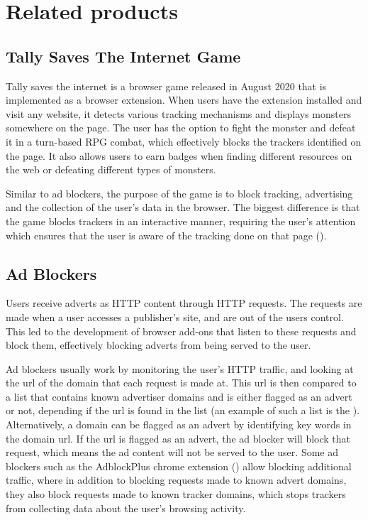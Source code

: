 \documentclass{l4proj}
\begin{document}
\section{Related products}
\label{related}
\subsection{Tally Saves The Internet Game}
Tally saves the internet is a browser game released in August 2020 that is implemented as a browser extension. When users have the extension installed and visit any website, it detects various tracking mechanisms and displays monsters somewhere on the page. The user has the option to fight the monster and defeat it in a turn-based RPG combat, which effectively blocks the trackers identified on the page. It also allows users to earn badges when finding different resources on the web or defeating different types of monsters.

Similar to ad blockers, the purpose of the game is to block tracking, advertising and the collection of the user's data in the browser. The biggest difference is that the game blocks trackers in an interactive manner, requiring the user's attention which ensures that the user is aware of the tracking done on that page (\cite{tally}). 

\subsection{Ad Blockers}
Users receive adverts as HTTP content through HTTP requests. The requests are made when a user accesses a publisher's site, and are out of the users control. This led to the development of browser add-ons that listen to these requests and block them, effectively blocking adverts from being served to the user. 

Ad blockers usually work by monitoring the user's HTTP traffic, and looking at the url of the domain that each request is made at. This url is then compared to a list that contains known advertiser domains and is either flagged as an advert or not, depending if the url is found in the list (an example of such a list is the \cite{easylist}). Alternatively, a domain can be flagged as an advert by identifying key words in the domain url. If the url is flagged as an advert, the ad blocker will block that request, which means the ad content will not be served to the user. Some ad blockers such as the AdblockPlus chrome extension (\cite{adblock}) allow blocking additional traffic, where in addition to blocking requests made to known advert domains, they also block requests made to known tracker domains, which stops trackers from collecting data about the user's browsing activity.
\end{document}
